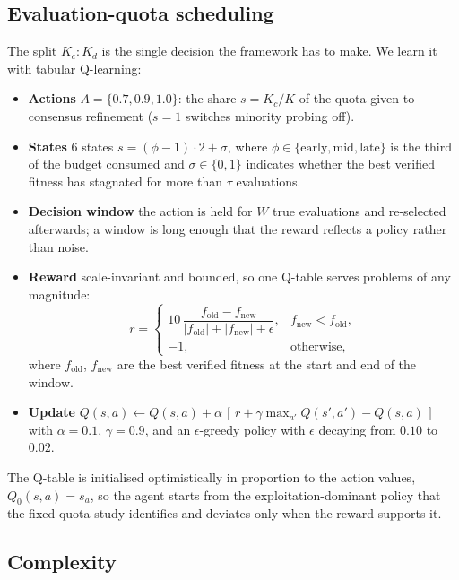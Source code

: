 \subsection{Evaluation-quota scheduling}
\label{sec:q}

The split $K_c{:}K_d$ is the single decision the framework has to make. We learn
it with tabular Q-learning:
\begin{itemize}
  \item \textbf{Actions} $A = \{0.7, 0.9, 1.0\}$: the share $s = K_c/K$ of the
        quota given to consensus refinement ($s=1$ switches minority probing off).
  \item \textbf{States} $6$ states $s = (\phi-1)\cdot 2 + \sigma$, where
        $\phi \in \{\text{early},\text{mid},\text{late}\}$ is the third of the
        budget consumed and $\sigma \in \{0,1\}$ indicates whether the best
        verified fitness has stagnated for more than $\tau$ evaluations.
  \item \textbf{Decision window} the action is held for $W$ true evaluations
        and re-selected afterwards; a window is long enough that the reward
        reflects a policy rather than noise.
  \item \textbf{Reward} scale-invariant and bounded, so one Q-table serves
        problems of any magnitude:
  \begin{equation}
  r = \begin{cases}
  10\,\dfrac{f_{\text{old}} - f_{\text{new}}}{\lvert f_{\text{old}}\rvert + \lvert f_{\text{new}}\rvert + \epsilon}, & f_{\text{new}} < f_{\text{old}},\\[4pt]
  -1, & \text{otherwise},
  \end{cases}
  \end{equation}
  where $f_{\text{old}}$, $f_{\text{new}}$ are the best verified fitness at the
  start and end of the window.
  \item \textbf{Update} $Q(s,a) \leftarrow Q(s,a) + \alpha\,[\,r + \gamma \max_{a'} Q(s',a') - Q(s,a)\,]$
        with $\alpha=0.1$, $\gamma=0.9$, and an $\epsilon$-greedy policy with
        $\epsilon$ decaying from $0.10$ to $0.02$.
\end{itemize}
The Q-table is initialised optimistically in proportion to the action values,
$Q_0(s,a) = s_a$, so the agent starts from the exploitation-dominant policy that
the fixed-quota study identifies and deviates only when the reward supports it.

\subsection{Complexity}

